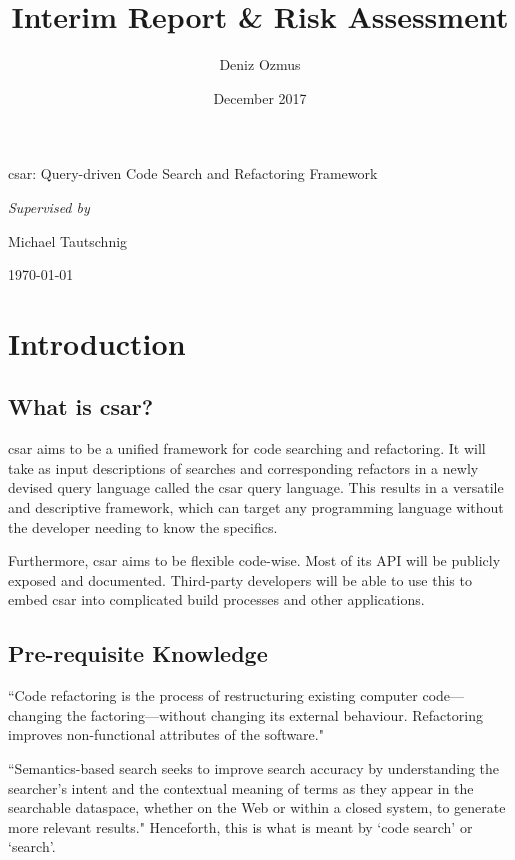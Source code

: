 \documentclass[12pt, letterpaper, oneside]{article}
\title{Interim Report \& Risk Assessment}
\author{Deniz Ozmus}
\date{December 2017}
\def \projecttitle {csar: Query-driven Code Search and Refactoring Framework}
\def \supervisor {Michael Tautschnig}
\begin{document}
\nocite{*}

\begin{titlepage}
    \centering
    {\Large \MyTitle\par}
    \vspace{0.5cm}
    {\projecttitle\par}
    \vspace{3cm}
    {\MyAuthor\par}
    \vspace{0.5cm}
    {\itshape Supervised by }{ \supervisor\par}
    \vspace{10cm}
    {\today\par}
\end{titlepage}

\tableofcontents
\newpage

\section{Introduction}
\subsection{What is csar?}

csar aims to be a unified framework for code searching and refactoring. It will take as input descriptions of searches and corresponding refactors in a newly devised query language called the csar query language. This results in a versatile and descriptive framework, which can target any programming language without the developer needing to know the specifics.

Furthermore, csar aims to be flexible code-wise. Most of its API will be publicly exposed and documented. Third-party developers will be able to use this to embed csar into complicated build processes and other applications.

\subsection{Pre-requisite Knowledge}
``Code refactoring is the process of restructuring existing computer code—changing the factoring—without changing its external behaviour. Refactoring improves non-functional attributes of the software." \autocite{wikipediacoderefactoring}

``Semantics-based search seeks to improve search accuracy by understanding the searcher's intent and the contextual meaning of terms as they appear in the searchable dataspace, whether on the Web or within a closed system, to generate more relevant results." \autocite{wikipediasemanticsearch} Henceforth, this is what is meant by `code search' or `search'.
\end{document}
